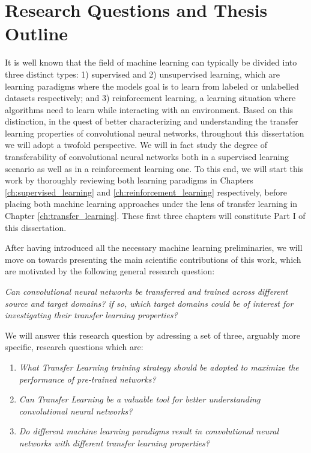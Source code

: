 \section*{Research Questions and Thesis Outline}
It is well known that the field of machine learning can typically be divided into three distinct types: 1) supervised and 2) unsupervised learning, which are learning paradigms where the models goal is to learn from labeled or unlabelled datasets respectively; and 3) reinforcement learning, a learning situation where algorithms need to learn while interacting with an environment. Based on this distinction, in the quest of better characterizing and understanding the transfer learning properties of convolutional neural networks, throughout this dissertation we will adopt a twofold perspective. We will in fact study the degree of transferability of convolutional neural networks both in a supervised learning scenario as well as in a reinforcement learning one. To this end, we will start this work by thoroughly reviewing both learning paradigms in Chapters \ref{ch:supervised_learning} and \ref{ch:reinforcement_learning} respectively, before placing both machine learning approaches under the lens of transfer learning in Chapter \ref{ch:transfer_learning}. These first three chapters will constitute Part I of this dissertation.

After having introduced all the necessary machine learning preliminaries, we will move on towards presenting the main scientific contributions of this work, which are motivated by the following general research question:
\begin{center}
	\textit{Can convolutional neural networks be transferred and trained across different source and target domains? if so, which target domains could be of interest for investigating their transfer learning properties?}	
\end{center}    

We will answer this research question by adressing a set of three, arguably more specific, research questions which are:
\begin{enumerate}
	\item \textit{What Transfer Learning training strategy should be adopted to maximize the performance of pre-trained networks?}

	\item \textit{Can Transfer Learning be a valuable tool for better understanding convolutional neural networks?}
	
	\item \textit{Do different machine learning paradigms result in convolutional neural networks with different transfer learning properties?}
\end{enumerate}

